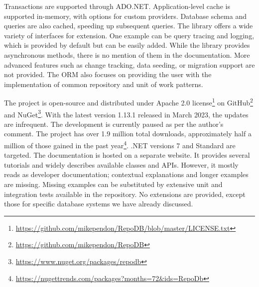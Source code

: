 Transactions are supported through ADO.NET. Application-level cache is supported in-memory, with options for custom providers. Database schema and queries are also cached, speeding up subsequent queries. The library offers a wide variety of interfaces for extension. One example can be query tracing and logging, which is provided by default but can be easily added. While the library provides asynchronous methods, there is no mention of them in the documentation. More advanced features such as change tracking, data seeding, or migration support are not provided. The ORM also focuses on providing the user with the implementation of common repository and unit of work patterns.

The project is open-source and distributed under Apache 2.0 license\footnote{\url{https://github.com/mikependon/RepoDB/blob/master/LICENSE.txt}} on GitHub\footnote{\url{https://github.com/mikependon/RepoDB}} and NuGet\footnote{\url{https://www.nuget.org/packages/repodb}}. With the latest version 1.13.1 released in March 2023, the updates are infrequent. The development is currently paused as per the author's comment\cite{PendonRepoDBComment}. The project has over 1.9 million total downloads, approximately half a million of those gained in the past year\footnote{\url{https://nugettrends.com/packages?months=72&ids=RepoDb}}. .NET versions 7 and Standard are targeted. The documentation is hosted on a separate website\cite{RepoDB}. It provides several tutorials and widely describes available classes and APIs. However, it mostly reads as developer documentation; contextual explanations and longer examples are missing. Missing examples can be substituted by extensive unit and integration tests available in the repository. No extensions are provided, except those for specific database systems we have already discussed.


